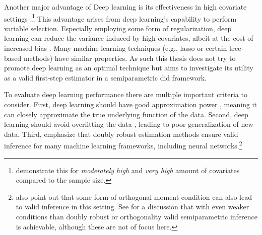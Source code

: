 Another major advantage of Deep learning is its effectiveness in high covariate settings \citep{chernozhukov2022automatic}.\footnote[3]{\citet{belloni2017program} demonstrate this for \textit{moderately high} and \textit{very high} amount of covariates compared to the sample size.}
This advantage arises from deep learning's capability to perform variable selection.
Especially employing some form of regularization, deep learning can reduce the variance induced by high covariates, albeit at the cost of increased bias \citep{chernozhukovDoubleDebiasedMachine2018}.
Many machine learning techniques (e.g., lasso or certain tree-based methods) have similar properties.
As such this thesis does not try to promote deep learning as an optimal technique but aims to investigate its utility as a valid first-step estimator in a semiparametric \ac{did} framework.

To evaluate deep learning performance there are multiple important criteria to consider.
First, deep learning should have good approximation power \citep{belloni2017program}, meaning it can closely approximate the true underlying function of the data.
Second, deep learning should avoid overfitting the data \citep{belloni2017program}, leading to poor generalization of new data.
Third, \citet{belloni2017program} emphasize that doubly robust estimation methods ensure valid inference for many machine learning frameworks, including neural networks.\footnote[4]{\citet{belloni2017program} also point out that some form of orthogonal moment condition can also lead to valid inference in this setting. See \citet{DeepLearningIndividual2021} for a discussion that with even weaker conditions than doubly robust or orthogonality valid semiparametric inference is achievable, although these are not of focus here.}
